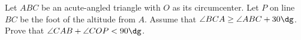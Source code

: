 Let $ABC$ be an acute-angled triangle with $O$ as its circumcenter.
Let $P$ on line $BC$ be the foot of the altitude from $A$.
Assume that $\angle BCA \ge \angle ABC + 30\dg$.
Prove that $\angle CAB + \angle COP < 90\dg$.